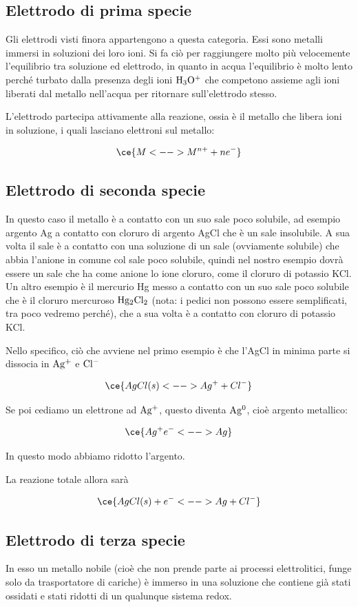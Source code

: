 \subsection{Elettrodo di prima specie}
Gli elettrodi visti finora appartengono a questa categoria. Essi sono metalli immersi in soluzioni dei loro ioni. Si fa ciò per raggiungere molto più velocemente l'equilibrio tra soluzione ed elettrodo, in quanto in acqua l'equilibrio è molto lento perché turbato dalla presenza degli ioni $\rm H_3O^+$ che competono assieme agli ioni liberati dal metallo nell'acqua per ritornare sull'elettrodo stesso.

L'elettrodo partecipa attivamente alla reazione, ossia è il metallo che libera ioni in soluzione, i quali lasciano elettroni sul metallo:

$$\ce{M <--> M^{n+} + ne^-}$$
\subsection{Elettrodo di seconda specie}
In questo caso il metallo è a contatto con un suo sale poco solubile, ad esempio argento Ag a contatto con cloruro di argento AgCl che è un sale insolubile. A sua volta il sale è a contatto con una soluzione di un sale (ovviamente solubile) che abbia l'anione in comune col sale poco solubile, quindi nel nostro esempio dovrà essere un sale che ha come anione lo ione cloruro, come il cloruro di potassio KCl. Un altro esempio è il mercurio Hg messo a contatto con un suo sale poco solubile che è il cloruro mercuroso $\rm Hg_2Cl_2$ (nota: i pedici non possono essere semplificati, tra poco vedremo perché), che a sua volta è a contatto con cloruro di potassio KCl.

Nello specifico, ciò che avviene nel primo esempio è che l'AgCl in minima parte si dissocia in $\rm Ag^+$ e $\rm Cl^-$

$$\ce{AgCl(s) <--> Ag^+ + Cl^-}$$

Se poi cediamo un elettrone ad $\rm Ag^+$, questo diventa $\rm Ag^0$, cioè argento metallico:

$$\ce{Ag^+ e^- <--> Ag}$$

In questo modo abbiamo ridotto l'argento.

La reazione totale allora sarà

$$\ce{AgCl(s) + e^- <--> Ag + Cl^-}$$
\subsection{Elettrodo di terza specie}
In esso un metallo nobile (cioè che non prende parte ai processi elettrolitici, funge solo da trasportatore di cariche) è immerso in una soluzione che contiene già stati ossidati e stati ridotti di un qualunque sistema redox.

